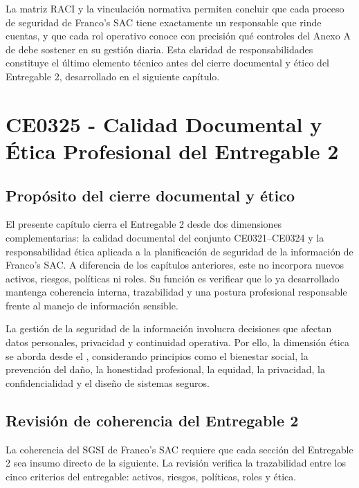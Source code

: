 \documentclass[11pt, a4paper, oneside]{report}
\begin{document}
\normalsize

La matriz RACI y la vinculación normativa permiten concluir que cada proceso de seguridad de Franco's SAC tiene exactamente un responsable que rinde cuentas, y que cada rol operativo conoce con precisión qué controles del Anexo A de \citet{iso27001} debe sostener en su gestión diaria. Esta claridad de responsabilidades constituye el último elemento técnico antes del cierre documental y ético del Entregable 2, desarrollado en el siguiente capítulo.

\chapter{CE0325 - Calidad Documental y Ética Profesional del Entregable 2}

\section{Propósito del cierre documental y ético}

El presente capítulo cierra el Entregable 2 desde dos dimensiones complementarias: la calidad documental del conjunto CE0321--CE0324 y la responsabilidad ética aplicada a la planificación de seguridad de la información de Franco's SAC. A diferencia de los capítulos anteriores, este no incorpora nuevos activos, riesgos, políticas ni roles. Su función es verificar que lo ya desarrollado mantenga coherencia interna, trazabilidad y una postura profesional responsable frente al manejo de información sensible.

La gestión de la seguridad de la información involucra decisiones que afectan datos personales, privacidad y continuidad operativa. Por ello, la dimensión ética se aborda desde el \citet{acmcode}, considerando principios como el bienestar social, la prevención del daño, la honestidad profesional, la equidad, la privacidad, la confidencialidad y el diseño de sistemas seguros.

\section{Revisión de coherencia del Entregable 2}

La coherencia del SGSI de Franco's SAC requiere que cada sección del Entregable 2 sea insumo directo de la siguiente. La revisión verifica la trazabilidad entre los cinco criterios del entregable: activos, riesgos, políticas, roles y ética.
\end{document}
